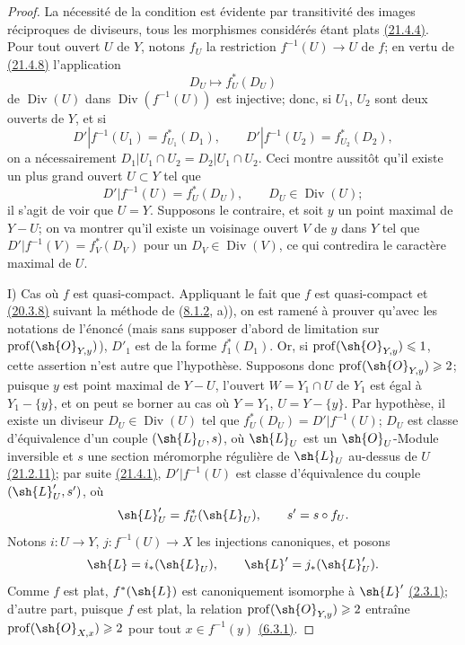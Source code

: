 \begin{proof}
La nécessité de la condition est évidente par transitivité des images
réciproques de diviseurs, tous les morphismes considérés étant plats
{\hyperlink{ega4.c04.statement.21-4-4}{(21.4.4)}}. Pour tout ouvert
$U$ de $Y$, notons $f_U$ la restriction $f^{-1}(U)\to U$ de $f$; en
vertu de {\hyperlink{ega4.c04.prop.21-4-8}{(21.4.8)}} l'application
\[
 D_U\longmapsto f_U^*(D_U)
\]
de $\operatorname{Div}(U)$ dans $\operatorname{Div}(f^{-1}(U))$ est
injective; donc, si $U_1$, $U_2$ sont deux ouverts de $Y$, et si
\[
 D'|f^{-1}(U_1)=f_{U_1}^*(D_1),\qquad
 D'|f^{-1}(U_2)=f_{U_2}^*(D_2),
\]
on a nécessairement
$D_1|U_1\cap U_2=D_2|U_1\cap U_2$. Ceci montre aussitôt qu'il existe
un plus grand ouvert $U\subset Y$ tel que
\[
 D'|f^{-1}(U)=f_U^*(D_U),
 \qquad D_U\in\operatorname{Div}(U);
\]
il s'agit de voir que $U=Y$. Supposons le contraire, et soit $y$ un
point maximal de $Y-U$; on va montrer qu'il existe un voisinage ouvert
$V$ de $y$ dans $Y$ tel que
$D'|f^{-1}(V)=f_V^*(D_V)$ pour un $D_V\in\operatorname{Div}(V)$, ce qui
contredira le caractère maximal de $U$.

\textup{I) Cas où $f$ est quasi-compact.} Appliquant le fait que $f$
est quasi-compact et {\hyperlink{ega4.c04.prop.20-3-8}{(20.3.8)}}
suivant la méthode de ({\hyperref[canon-index.ega4.c04.statement.8-1-2]{8.1.2}},
a)), on est ramené à prouver qu'avec les notations de l'énoncé (mais
sans supposer d'abord de limitation sur
$\operatorname{prof}(\sh{O}_{Y,y})$), $D'_1$ est de la forme
$f_1^*(D_1)$. Or, si $\operatorname{prof}(\sh{O}_{Y,y})\leq1$, cette
assertion n'est autre que l'hypothèse. Supposons donc
$\operatorname{prof}(\sh{O}_{Y,y})\geq2$; puisque $y$ est point maximal
de $Y-U$, l'ouvert $W=Y_1\cap U$ de $Y_1$ est égal à $Y_1-\{y\}$, et
on peut se borner au cas où $Y=Y_1$, $U=Y-\{y\}$. Par hypothèse, il
existe un diviseur $D_U\in\operatorname{Div}(U)$ tel que
$f_U^*(D_U)=D'|f^{-1}(U)$; $D_U$ est classe d'équivalence d'un couple
$(\sh{L}_U,s)$, où $\sh{L}_U$ est un $\sh{O}_U$-Module inversible et
$s$ une section méromorphe régulière de $\sh{L}_U$ au-dessus de $U$
{\hyperlink{ega4.c04.prop.21-2-11}{(21.2.11)}}; par suite
{\hyperlink{ega4.c04.statement.21-4-1}{(21.4.1)}},
$D'|f^{-1}(U)$ est classe d'équivalence du couple
$(\sh{L}'_U,s')$, où
\[
 \sh{L}'_U=f_U^*(\sh{L}_U),\qquad s'=s\circ f_U.
\]
Notons $i:U\to Y$, $j:f^{-1}(U)\to X$ les injections canoniques, et
posons
\[
 \sh{L}=i_*(\sh{L}_U),\qquad
 \sh{L}'=j_*(\sh{L}'_U).
\]
Comme $f$ est plat, $f^*(\sh{L})$ est canoniquement isomorphe à
$\sh{L}'$ {\hyperref[canon-index.ega4.c04.lem.2-3-1]{(2.3.1)}}; d'autre part,
puisque $f$ est plat, la relation
$\operatorname{prof}(\sh{O}_{Y,y})\geq2$ entraîne
$\operatorname{prof}(\sh{O}_{X,x})\geq2$ pour tout $x\in f^{-1}(y)$
{\hyperref[canon-index.ega4.c04.prop.6-3-1]{(6.3.1)}}.


\end{proof}
